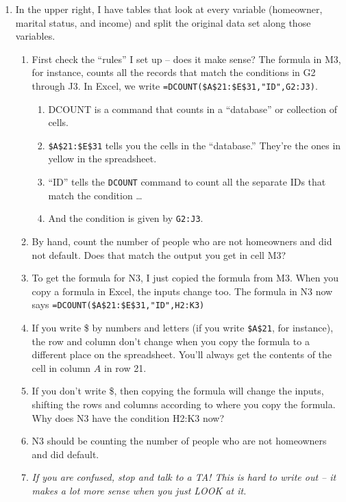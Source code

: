 \documentclass[10pt]{article}
\newcommand{\code}[1]{\colorbox{light-gray}{\texttt{#1}}}
\begin{document}
\begin{enumerate}
\item In the upper right, I have tables that look at every variable (homeowner, marital status, and income) and split the original data set along those variables.
\begin{enumerate}
\item First check the ``rules'' I set up -- does it make sense? The formula in M3, for instance, counts all the records that match the conditions in G2 through J3. In Excel, we write \code{=DCOUNT(\$A\$21:\$E\$31,"ID",G2:J3)}.
\begin{enumerate}
\item DCOUNT is a command that counts in a ``database'' or collection of cells.
\item \code{\$A\$21:\$E\$31} tells you the cells in the ``database.'' They're the ones in yellow in the spreadsheet.
\item ``ID'' tells the \code{DCOUNT} command to count all the separate IDs that match the condition \ldots
\item And the condition is given by \code{G2:J3}.
\end{enumerate}
\item By hand, count the number of people who are not homeowners and did not default. Does that match the output you get in cell M3?
\item To get the formula for N3, I just copied the formula from M3. When you copy a formula in Excel, the inputs change too. The formula in N3 now says \code{=DCOUNT(\$A\$21:\$E\$31,"ID",H2:K3)}
\item If you write \$ by numbers and letters (if you write \code{\$A\$21}, for instance), the row and column don't change when you copy the formula to a different place on the spreadsheet. You'll always get the contents of the cell in column $A$ in row 21.
\item If you don't write \$, then copying the formula will change the inputs, shifting the rows and columns according to where you copy the formula. Why does N3 have the condition H2:K3 now?
\item N3 should be counting the number of people who are not homeowners and did default.
\item \textit{If you are confused, stop and talk to a TA! This is hard to write out -- it makes a lot more sense when you just LOOK at it.}
\end{enumerate}


\end{enumerate}
\end{document}
